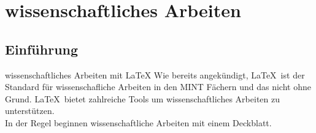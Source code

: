 \section{wissenschaftliches Arbeiten}
\subsection{Einf\"uhrung}
\begin{frame}{wissenschaftliches Arbeiten mit \LaTeX}
 Wie bereits angek\"undigt, \LaTeX~ist der Standard f\"ur wissenschafliche Arbeiten in den MINT F\"achern und das nicht ohne Grund. \LaTeX~bietet zahlreiche Tools um wissenschaftliches Arbeiten zu unterst\"utzen.\\\vspace{3mm} In der Regel beginnen wissenschaftliche Arbeiten mit einem Deckblatt.
\end{frame}
